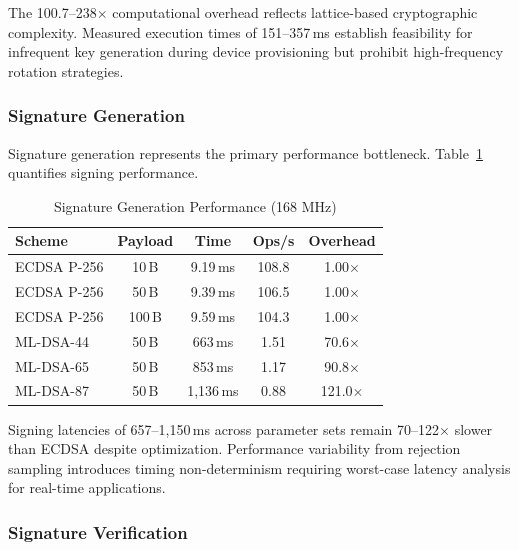 \documentclass[final, twoside]{IEEEtran} %
\begin{document}
The 100.7--238$\times$ computational overhead reflects lattice-based cryptographic complexity. Measured execution times of 151--357\,ms establish feasibility for infrequent key generation during device provisioning but prohibit high-frequency rotation strategies.

\subsubsection{Signature Generation}

Signature generation represents the primary performance bottleneck. Table~\ref{tab:sign-performance} quantifies signing performance.

\begin{table}[h]
	\centering
	\caption{Signature Generation Performance (168 MHz)}
	\label{tab:sign-performance}
	\begin{tabular}{lcccc}
		\toprule
		\textbf{Scheme} & \textbf{Payload} & \textbf{Time} & \textbf{Ops/s} & \textbf{Overhead} \\
		\midrule
		ECDSA P-256     & 10\,B            & 9.19\,ms      & 108.8          & 1.00$\times$      \\
		ECDSA P-256     & 50\,B            & 9.39\,ms      & 106.5          & 1.00$\times$      \\
		ECDSA P-256     & 100\,B           & 9.59\,ms      & 104.3          & 1.00$\times$      \\
		\midrule
		ML-DSA-44       & 50\,B            & 663\,ms       & 1.51           & 70.6$\times$      \\
		ML-DSA-65       & 50\,B            & 853\,ms       & 1.17           & 90.8$\times$      \\
		ML-DSA-87       & 50\,B            & 1,136\,ms     & 0.88           & 121.0$\times$     \\
		\bottomrule
	\end{tabular}
\end{table}

Signing latencies of 657--1,150\,ms across parameter sets remain 70--122$\times$ slower than ECDSA despite optimization. Performance variability from rejection sampling introduces timing non-determinism requiring worst-case latency analysis for real-time applications.

\subsubsection{Signature Verification}
\end{document}

